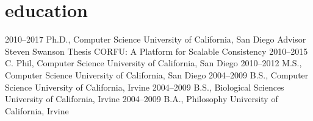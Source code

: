 \section{education}

\begin{entrylist}

\courseentry
{2010--2017}
{Ph.D., Computer Science}
{University of California, San Diego}
{{\footnotesize Advisor} Steven Swanson}
{{\footnotesize Thesis} CORFU: A Platform for Scalable Consistency}
\eduentry
{2010--2015}
{C. Phil, Computer Science}
{University of California, San Diego}
\eduentry
{2010--2012}
{M.S., Computer Science}
{University of California, San Diego}
\eduentry
{2004--2009}
{B.S., Computer Science}
{University of California, Irvine}
\eduentry
{2004--2009}
{B.S., Biological Sciences}
{University of California, Irvine}
\eduentry
{2004--2009}
{B.A., Philosophy}
{University of California, Irvine}
\end{entrylist}
